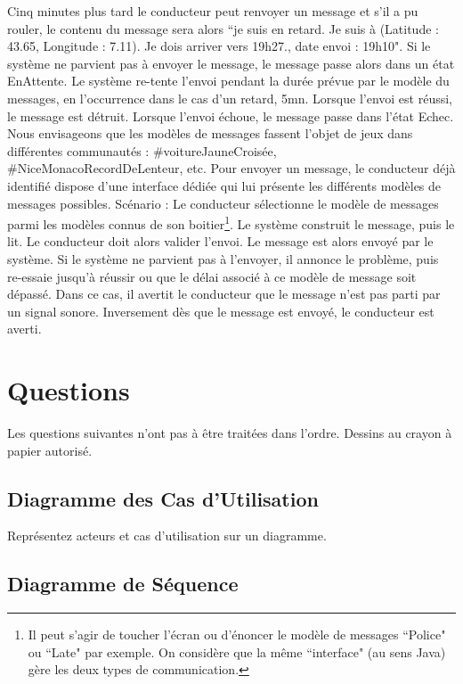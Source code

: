 \documentclass[12pt,French]{article}
\begin{document}
Cinq minutes plus tard le conducteur peut renvoyer un message et s'il a pu rouler, le  contenu du message sera alors ``je suis en retard. Je suis à (Latitude : 43.65, Longitude :  7.11). Je dois arriver vers 19h27., date envoi : 19h10". 
Si le système ne parvient pas à  envoyer le message, le message passe alors dans un état EnAttente. Le système re-tente  l'envoi pendant la durée prévue par le modèle du messages, en l'occurrence dans le cas  d'un  retard,  5mn.  
Lorsque  l'envoi  est  réussi,  le  message  est  détruit.  
Lorsque  l'envoi  échoue, le message passe dans l'état Echec.  
Nous envisageons que les modèles de messages fassent l'objet de jeux dans différentes  communautés : \#voitureJauneCroisée, \#NiceMonacoRecordDeLenteur, etc.
Pour envoyer un message, le conducteur déjà identifié dispose d'une interface dédiée  qui lui présente les différents modèles de messages possibles. 
Scénario : Le conducteur sélectionne le modèle de messages parmi les modèles connus  de son boitier\footnote{Il peut s'agir de toucher l'écran ou d'énoncer le modèle de messages ``Police" ou ``Late" par exemple. On considère que la même ``interface" (au sens Java) gère les deux types de communication.}. 
Le système construit le message, puis le lit. Le conducteur doit alors  valider l'envoi. 
Le message est alors envoyé par le système. 
Si le système ne parvient pas  à l'envoyer, il annonce le problème, puis re-essaie jusqu'à réussir ou que le délai associé  à  ce  modèle  de  message  soit  dépassé.  
Dans  ce  cas,  il  avertit  le  conducteur  que  le  message  n'est  pas  parti  par  un  signal  sonore.  
Inversement  dès  que  le  message  est  envoyé, le conducteur est averti.

\section{Questions}

Les questions suivantes n'ont pas à être traitées dans l'ordre. Dessins au crayon à papier autorisé.

\subsection{Diagramme des Cas d'Utilisation}

Représentez acteurs et cas d'utilisation sur un diagramme. 

\subsection{Diagramme de Séquence}
\end{document}
